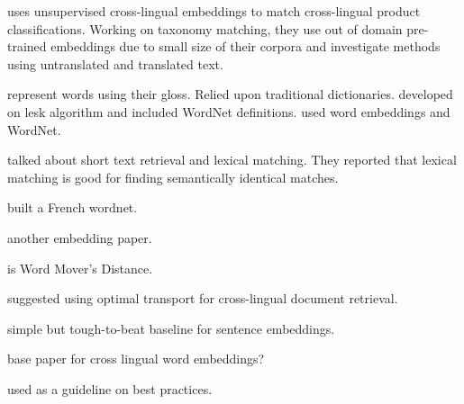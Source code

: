 \textcite{gordeev_unsupervised_2018} uses unsupervised cross-lingual embeddings to match cross-lingual product classifications.
Working on taxonomy matching, they use out of domain pre-trained embeddings due to small size of their corpora and investigate methods using untranslated and translated text.

\textcite{lesk_automatic_1986} represent words using their gloss. Relied upon traditional dictionaries.
\textcite{banerjee_adapted_2002} developed on lesk algorithm and included WordNet definitions.
\textcite{khodak_automated_2017} used word embeddings and WordNet.

\textcite{metzler_similarity_2007} talked about short text retrieval and lexical matching. They reported that lexical matching is good for finding semantically identical matches.

\textcite{sagot_building_2008} built a French wordnet.

\textcite{xiao_distributed_2014} another embedding paper.

\textcite{kusner_word_2015} is Word Mover's Distance.

\textcite{balikas_cross-lingual_2018} suggested using optimal transport for cross-lingual document retrieval.

\textcite{arora_simple_2016} simple but tough-to-beat baseline for sentence embeddings.

\textcite{klementiev_inducing_2012} base paper for cross lingual word embeddings?

\textcite{irvine_comprehensive_2017} used as a guideline on best practices.

